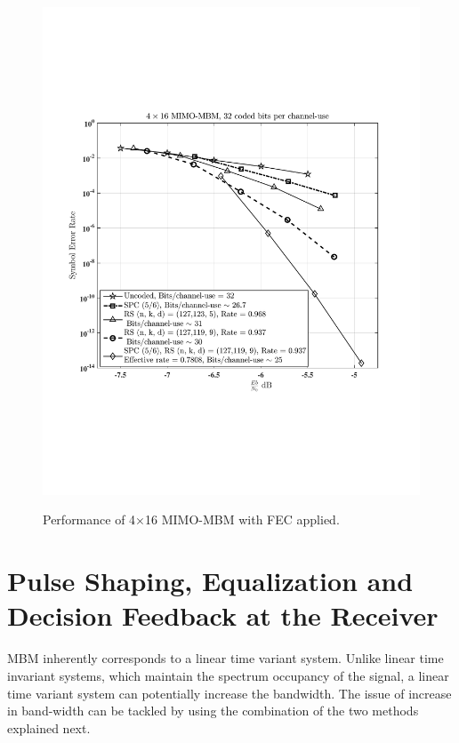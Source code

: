 \begin{figure}[t]
\centering
\vspace{-1cm}

{\includegraphics[scale = 0.65,  trim = 3cm 5cm 3cm 5cm]{./fig/MBM_coded}}
\caption{Performance of 4$\times$16 MIMO-MBM with  FEC applied.}

\label{coded}
\end{figure}


\section {Pulse Shaping, Equalization and Decision Feedback at the Receiver}
\label{sec : Pulse Shaping}
MBM inherently corresponds to a linear time variant system. Unlike linear time invariant systems, which maintain the spectrum occupancy of the signal, a linear time variant system can potentially increase the bandwidth. The issue of increase in band-width can be tackled by using the combination of the two methods explained next.

